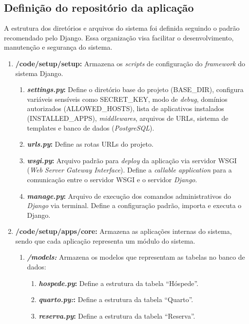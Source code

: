 \documentclass[
	12pt,				%
	openany,			%
	oneside,			%
	a4paper,			%
	english,			%
	french,				%
	spanish,			%
	brazil				%
	]{abntex2}
\begin{document}
\subsection{Definição do repositório da aplicação}A estrutura dos diretórios e arquivos do sistema foi definida  seguindo o padrão recomendado pelo Django. Essa organização visa facilitar o desenvolvimento, manutenção e segurança do sistema.
%
\begin{enumerate}
	\item \textbf{/code/setup/setup:} Armazena os \textit{scripts} de configuração do \textit{framework} do sistema Django.
	\begin{enumerate}
		\item \textbf{\textit{settings.py}:} Define o diretório base do projeto (BASE\_DIR), configura variáveis sensíveis como SECRET\_KEY, modo de \textit{debug}, domínios autorizados (ALLOWED\_HOSTS), lista de aplicativos instalados (INSTALLED\_APPS), \textit{middlewares}, arquivos de URLs, sistema de templates e banco de dados (\textit{PostgreSQL}).
		\item \textbf{\textit{urls.py}:} Define as rotas URLs do projeto.
		\item \textbf{\textit{wsgi.py}:} Arquivo padrão para \textit{deploy} da aplicação via servidor WSGI (\textit{Web Server Gateway Interface}). Define a \textit{callable application} para a comunicação entre o servidor WSGI e o servidor \textit{Django}.
		\item \textbf{\textit{manage.py}:} Arquivo de execução dos comandos administrativos do \textit{Django} via terminal. Define a configuração padrão, importa e executa o Django.
	\end{enumerate}
	\item \textbf{/code/setup/apps/core:} Armazena as aplicações internas do sistema, sendo que cada aplicação representa um módulo do sistema.
	\begin{enumerate}
		\item \textbf{\textit{/models:}} Armazena os modelos que representam as tabelas no banco de dados:
		\begin{enumerate}
			\item \textbf{\textit{hospede.py}:} Define a estrutura da tabela “Hóspede”.
			\item \textbf{\textit{quarto.py:}:} Define a estrutura da tabela “Quarto”.
			\item \textbf{\textit{reserva.py}:}  Define a estrutura da tabela “Reserva”.
		\end{enumerate}

\end{enumerate}
\end{enumerate}
\end{document}
